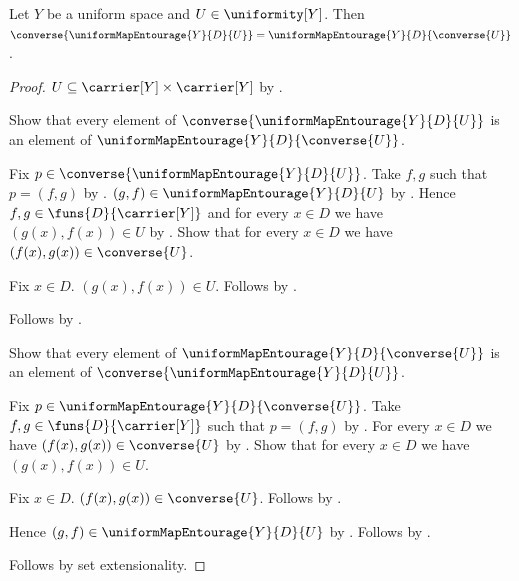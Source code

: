\begin{proposition}\label{uniform_map_entourage_converse}
    Let $Y$ be a uniform space and $U\in\uniformity[Y]$.
    Then $\converse{\uniformMapEntourage{Y}{D}{U}}=
        \uniformMapEntourage{Y}{D}{\converse{U}}$.
\end{proposition}
\begin{proof}
    $U\subseteq\carrier[Y]\times\carrier[Y]$
        by .

    Show that every element of
        $\converse{\uniformMapEntourage{Y}{D}{U}}$ is an element of
        $\uniformMapEntourage{Y}{D}{\converse{U}}$.
    \begin{subproof}
        Fix $p\in\converse{\uniformMapEntourage{Y}{D}{U}}$.
        Take $f,g$ such that $p=(f,g)$
            by .
        $(g,f)\in\uniformMapEntourage{Y}{D}{U}$
            by .
        Hence $f,g\in\funs{D}{\carrier[Y]}$ and for every $x\in D$ we
            have $(g(x),f(x))\in U$ by
            .
        Show that for every $x\in D$ we have
            $(f(x),g(x))\in\converse{U}$.
        \begin{subproof}
            Fix $x\in D$.
            $(g(x),f(x))\in U$.
            Follows by .
        \end{subproof}
        Follows by .
    \end{subproof}

    Show that every element of
        $\uniformMapEntourage{Y}{D}{\converse{U}}$ is an element of
        $\converse{\uniformMapEntourage{Y}{D}{U}}$.
    \begin{subproof}
        Fix $p\in\uniformMapEntourage{Y}{D}{\converse{U}}$.
        Take $f,g\in\funs{D}{\carrier[Y]}$ such that $p=(f,g)$ by
            .
        For every $x\in D$ we have $(f(x),g(x))\in\converse{U}$ by
            .
        Show that for every $x\in D$ we have $(g(x),f(x))\in U$.
        \begin{subproof}
            Fix $x\in D$.
            $(f(x),g(x))\in\converse{U}$.
            Follows by .
        \end{subproof}
        Hence $(g,f)\in\uniformMapEntourage{Y}{D}{U}$ by
            .
        Follows by .
    \end{subproof}
    Follows by set extensionality.
\end{proof}

